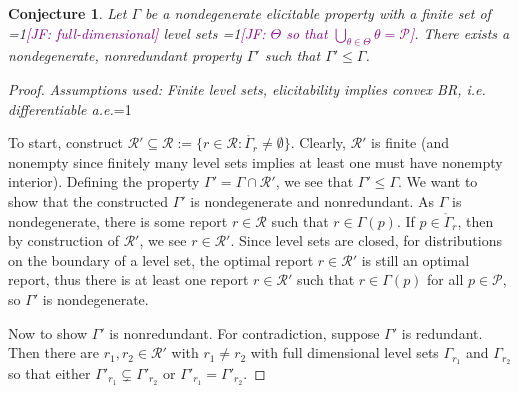 \documentclass[12pt]{article}
\newcommand{\Comments}{1}
\newcommand{\mynote}[2]{\ifnum\Comments=1\textcolor{#1}{#2}\fi}
\newcommand{\mytodo}[2]{\ifnum\Comments=1%
  \todo[linecolor=#1!80!black,backgroundcolor=#1,bordercolor=#1!80!black]{#2}\fi}
\newcommand{\raft}[1]{\mytodo{green!20!white}{RF: #1}}
\newcommand{\jessie}[1]{\mynote{purple}{[JF: #1]}}
\renewcommand{\P}{\mathcal{P}}
\newcommand{\R}{\mathcal{R}}
\newcommand{\inter}[1]{\mathring{#1}}%
\newtheorem{conjecture}{Conjecture}
\begin{document}
\begin{conjecture}\label{conj:gam-prime-exists}
	Let $\Gamma$ be a nondegenerate elicitable property with a finite set of \jessie{full-dimensional} level sets \jessie{$\Theta$ so that $\bigcup_{\theta \in \Theta}\theta = \P$}.
	There exists a nondegenerate, nonredundant property $\Gamma'$ such that $\Gamma' \leq \Gamma$. 
\end{conjecture}
\begin{proof}
\emph{Assumptions used: Finite level sets, elicitability implies convex BR, i.e. differentiable a.e.}\raft{Confused by BR}

	To start, construct $\R' \subseteq \R := \{ r \in \R : \inter{\Gamma_r} \neq \emptyset \}$.
	Clearly, $\R'$ is finite (and nonempty since finitely many level sets implies at least one must have nonempty interior).
	Defining the property $\Gamma' = \Gamma\cap \R'$, we see that $\Gamma' \leq \Gamma$.
	We want to show that the constructed $\Gamma'$ is nondegenerate and nonredundant.
	As $\Gamma$ is nondegenerate, there is some report $r \in \R$ such that $r \in \Gamma(p)$.
	If $p \in \inter{\Gamma}_r$, then by construction of $\R'$, we see $r \in \R'$.
	Since level sets are closed, for distributions on the boundary of a level set, the optimal report $r \in \R'$ is still an optimal report, thus there is at least one report $r \in \R'$ such that $r \in \Gamma(p)$ for all $p \in \P$, so $\Gamma'$ is nondegenerate. 
	
	
	Now to show $\Gamma'$ is nonredundant.
	For contradiction, suppose $\Gamma'$ is redundant.
	Then there are $r_1, r_2 \in \R'$ with $r_1 \neq r_2$ with full dimensional level sets $\Gamma_{r_1}$ and $\Gamma_{r_2}$ so that either $\Gamma'_{r_1} \subsetneq \Gamma'_{r_2}$ or $\Gamma'_{r_1} = \Gamma'_{r_2}$.
	

\end{proof}
\end{document}
